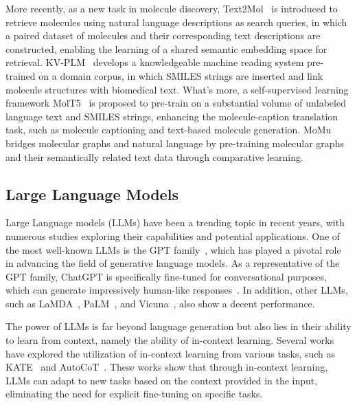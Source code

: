 \documentclass{article}
\theoremstyle{plain}
\theoremstyle{definition}
\theoremstyle{remark}
\begin{document}
More recently, as a new task in molecule discovery, Text2Mol~\cite{edwards2021text2mol} is introduced to retrieve molecules using natural language descriptions as search queries, in which a paired dataset of molecules and their corresponding text descriptions are constructed, enabling the learning of a shared semantic embedding space for retrieval.
KV-PLM~\cite{zeng2022deep} develops a knowledgeable machine reading system pre-trained on a domain corpus, in which SMILES strings are inserted and link molecule structures with biomedical text.
What's more, a self-supervised learning framework MolT5~\cite{edwards-etal-2022-translation} is proposed to pre-train on a substantial volume of unlabeled language text and SMILES strings, enhancing the molecule-caption translation task, such as molecule captioning and text-based molecule generation.
MoMu~\cite{su2022molecular} bridges molecular graphs and natural language by pre-training molecular graphs and their semantically related text data through comparative learning. 



\subsection{Large Language Models} 

Large Language models (LLMs) have been a trending topic in recent years, with numerous studies exploring their capabilities and potential applications. 
One of the most well-known LLMs is the GPT family~\cite{radford2018improving,radford2019language,brown2020language,ouyang2022training}, which has played a pivotal role in advancing the field of generative language models. As a representative of the GPT family, ChatGPT is specifically fine-tuned for conversational purposes, which can generate impressively human-like responses~\cite{leiter2023chatgpt}. In addition, other LLMs, such as LaMDA~\cite{thoppilan2022lamda}, PaLM~\cite{chowdhery2022palm}, and Vicuna~\cite{chiang2023vicuna}, also show a decent performance. 

The power of LLMs is far beyond language generation but also lies in their ability to learn from context, namely the ability of in-context learning. Several works have explored the utilization of in-context learning from various tasks, such as KATE~\cite{liu2021makes} and AutoCoT~\cite{zhang2022automatic}. These works show that through in-context learning, LLMs can adapt to new tasks based on the context provided in the input, eliminating the need for explicit fine-tuning on specific tasks. 
\end{document}

